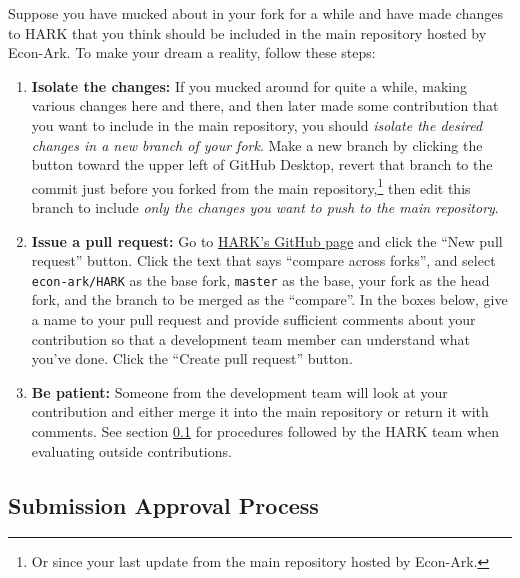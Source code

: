 \documentclass[12pt,titlepage,letterpaper]{econtex}
\begin{document}
Suppose you have mucked about in your fork for a while and have made changes to HARK that you think should be included in the main repository hosted by Econ-Ark.  To make your dream a reality, follow these steps:
\begin{enumerate}
\item \textbf{Isolate the changes:} If you mucked around for quite a while, making various changes here and there, and then later made some contribution that you want to include in the main repository, you should \textit{isolate the desired changes in a new branch of your fork}.  Make a new branch by clicking the button toward the upper left of GitHub Desktop, revert that branch to the commit just before you forked from the main repository,\footnote{Or since your last update from the main repository hosted by Econ-Ark.} then edit this branch to include \textit{only the changes you want to push to the main repository}.

\item \textbf{Issue a pull request:} Go to \href{https://github.com/econ-ark/HARK}{HARK's GitHub page} and click the ``New pull request'' button.  Click the text that says ``compare across forks'', and select \texttt{econ-ark/HARK} as the base fork, \texttt{master} as the base, your fork as the head fork, and the branch to be merged as the ``compare''.  In the boxes below, give a name to your pull request and provide sufficient comments about your contribution so that a development team member can understand what you've done.  Click the ``Create pull request'' button.

\item \textbf{Be patient:} Someone from the development team will look at your contribution and either merge it into the main repository or return it with comments.  See section \ref{sec:SubmissionApprovalProcess} for procedures followed by the HARK team when evaluating outside contributions.

\end{enumerate}

\subsection{Submission Approval Process}\label{sec:SubmissionApprovalProcess}
\end{document}
